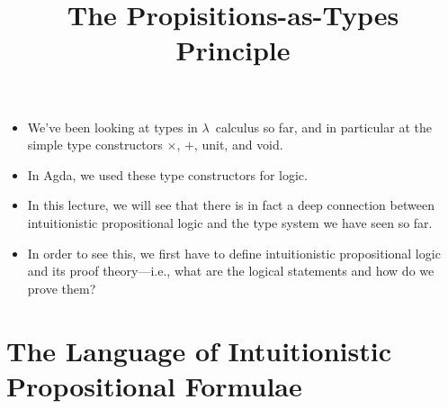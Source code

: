 \documentclass{lecturenotes}
\title{The Propisitions-as-Types Principle}
\newcommand{\utype}{\textsf{unit}\xspace}
\newcommand{\vtype}{\textsf{void}\xspace}
\begin{document}
\maketitle

\begin{itemize}
\item We've been looking at types in $\lambda$~calculus so far, and in particular at the simple type constructors $\times$, $+$, \utype, and \vtype.
\item In Agda, we used these type constructors for logic. 
\item In this lecture, we will see that there is in fact a deep connection between intuitionistic propositional logic and the type system we have seen so far.
\item In order to see this, we first have to define intuitionistic propositional logic and its proof theory---i.e., what are the logical statements and how do we prove them?
\end{itemize}

\section{The Language of Intuitionistic Propositional Formulae}
\label{sec:lang-intu-prop}

\begin{syntax}
  \category[Formulae]{\varphi, \psi, \dots} \alternative{\top} \alternative{\bot} \\
  \alternative{\varphi \land \psi} \alternative{\varphi \lor \psi} \alternative{\varphi \to \psi} 
\end{syntax}
\end{document}

